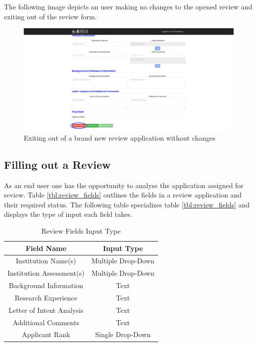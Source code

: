 \documentclass[fontsize=12pt,paper=letter,twoside]{scrartcl}
\begin{document}
\bigskip
\noindent The following image depicts an user making no changes to the opened review and exiting out of the review form.

\begin{figure}[!htb]
\begin{center}
\includegraphics[width=.9\textwidth]{images/new_review_exit_wo_changes.png}
\end{center}
\caption{Exiting out of a brand new review application without changes}
\label{fig:new_review_exit_w/o_changes}
\end{figure}

\subsection{Filling out a Review}
As an end user one has the opportunity to analyse the application assigned for review. Table \ref{tbl:review_fields} outlines the fields in a review application and their required status. The following table specializes table \ref{tbl:review_fields} and displays the type of input each field takes.

\begin{table}[h]
\centering
\begin{tabular}{|c | c |}
	\cline{1-2}
	\textbf{Field Name} & \textbf{Input Type}\\ \hline
	Institution Name(s) & Multiple Drop-Down \\ \hline
	Institution Assessment(s) & Multiple Drop-Down \\ \hline
	Background Information & Text \\ \hline
	Research Experience & Text \\ \hline
	Letter of Intent Analysis & Text \\ \hline
	Additional Comments & Text \\ \hline
	Applicant Rank & Single Drop-Down \\ \hline
\end{tabular}
\caption {Review Fields Input Type}
\label{tbl:review_fields_input}
\end{table}
\end{document}
